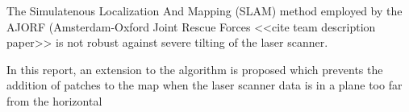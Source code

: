 The Simulatenous Localization And Mapping (SLAM) method employed by the AJORF (Amsterdam-Oxford Joint Rescue Forces <<cite team description paper>> is not robust against severe tilting of the laser scanner. 

In this report, an extension to the algorithm is proposed which prevents the addition of patches to the map when the laser scanner data is in a plane too far from the horizontal